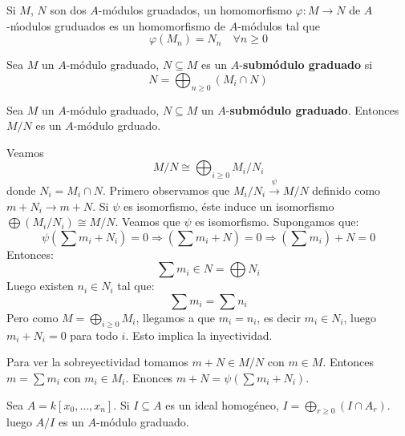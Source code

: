 \documentclass[ACGA.tex]{subfiles}
\begin{document}
\begin{defi}
Si $M$, $N$ son dos $A$-módulos gruadados, un homomorfismo $φ : M \to N$ de $A$-ḿodulos gruduados es un homomorfismo de $A$-módulos tal que
\[ φ(M_n) = N_n \quad \forall n ≥ 0 \]
\end{defi}

\begin{defi}
Sea $M$ un $A$-módulo graduado, $N \subseteq M$ es un $A$-\textbf{submódulo graduado} si
\[ N = \bigoplus_{n≥0} (M_i \cap N) \]
\end{defi}

\begin{teorema}
Sea $M$ un $A$-módulo graduado, $N \subseteq M$ un $A$-\textbf{submódulo graduado}. Entonces $M/N$ es un $A$-módulo grduado. 
\end{teorema}
\begin{dem}
Veamos
\[ M/N \cong \bigoplus_{i≥0} M_i / N_i \]
donde $N_i = M_i \cap N$. Primero observamos que $M_i/N_i \xrightarrow{ψ} M/N$ definido como $m + N_i \to m+N$. Si $ψ$ es isomorfismo, éste induce un isomorfismo $\bigoplus (M_i/N_i) \cong M/N$. Veamos que $ψ$ es isomorfismo. Supongamos que:
\[ ψ\left(\sum m_i + N_i\right) = 0 \Rightarrow  \left(\sum m_i + N\right) = 0 \Rightarrow  \left(\sum m_i\right) + N = 0\]
Entonces:
\[ \sum m_i \in N = \bigoplus N_i \]
Luego existen $n_i \in N_i$ tal que:
\[ \sum m_i = \sum n_i\]
Pero como $M = \bigoplus_{i≥0} M_i$, llegamos a que $m_i = n_i$, es decir $m_i \in N_i$, luego $m_i + N_i = 0$ para todo $i$. Esto implica la inyectividad.

Para ver la sobreyectividad tomamos $m+N \in M/N$ con $m \in M$. Entonces $m = \sum m_i$ con $m_i \in M_i$. Enonces $m+N = ψ\left(\sum m_i + N_i\right)$.
\end{dem}

\begin{ej}
Sea $A = k[x_0,\dots,x_n]$. Si $I \subseteq A$ es un ideal homogéneo, $I = \bigoplus_{r≥0} \left(I \cap A_r\right)$. luego $A/I$ es un $A$-módulo graduado.
\end{ej}
\end{document}
